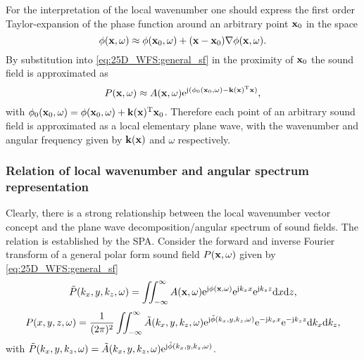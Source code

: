 For the interpretation of the local wavenumber one should express the first order Taylor-expansion of the phase function around an arbitrary point $\mathbf{x}_0$ in the space
\begin{equation}
\phi(\mathbf{x},\omega) \approx \phi(\mathbf{x}_0,\omega) + (\mathbf{x}-\mathbf{x}_0) \nabla \phi(\mathbf{x},\omega).
\end{equation}
By substitution into \eqref{eq:25D_WFS:general_sf} in the proximity of $\mathbf{x}_0$ the sound field is approximated as
\begin{equation}
P(\mathbf{x},\omega) \approx A(\mathbf{x},\omega) \mathrm{e}^{\mathrm{j} ( \phi_0(\mathbf{x}_0,\omega) - \mathbf{k}(\mathbf{x})^{\mathrm{T}} \mathbf{x} )},
\end{equation}
with $\phi_0(\mathbf{x}_0,\omega) = \phi(\mathbf{x}_0,\omega) + \mathbf{k}(\mathbf{x})^{\mathrm{T}} \mathbf{x}_0 $.
Therefore each point of an arbitrary sound field is approximated as a local elementary plane wave, with the wavenumber and angular frequency given by $\mathbf{k}(\mathbf{x})$ and $\omega$ respectively.

\subsubsection{Relation of local wavenumber and angular spectrum representation}
Clearly, there is a strong relationship between the local wavenumber vector concept and the plane wave decomposition/angular spectrum of sound fields.
The relation is established by the SPA.
Consider the forward and inverse Fourier transform of a general polar form sound field $P(\mathbf{x},\omega)$ given by \eqref{eq:25D_WFS:general_sf}
\begin{equation}
\tilde{P}(k_x,y,k_z,\omega) = \iint_{-\infty}^{\infty} A(\mathbf{x},\omega)\mathrm{e}^{\mathrm{j} \phi(\mathbf{x},\omega)} \mathrm{e}^{\mathrm{j} k_x x} \mathrm{e}^{\mathrm{j} k_z z} \mathrm{d} x \mathrm{d} z,
\label{eq:forward_transform}
\end{equation}
\begin{equation}
P(x,y,z,\omega) = \frac{1}{(2\pi)^2} \iint_{-\infty}^{\infty} \tilde{A}(k_x,y,k_z,\omega)\mathrm{e}^{\mathrm{j} \tilde{\phi}(k_x,y,k_z,\omega)}  \mathrm{e}^{-\mathrm{j} k_x x} \mathrm{e}^{-\mathrm{j} k_z z} \mathrm{d} k_x \mathrm{d} k_z,
\label{eq:inverse_transform}
\end{equation}
with $\tilde{P}(k_x,y,k_z,\omega) =\tilde{A}(k_x,y,k_z,\omega)\mathrm{e}^{\mathrm{j} \tilde{\phi}(k_x,y,k_z,\omega)}$.

